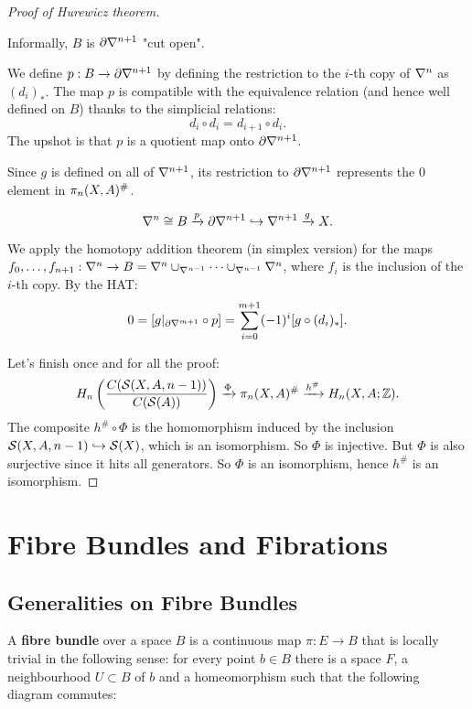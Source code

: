 \begin{proof}[Proof of Hurewicz theorem]
\begin{claimproof}
Informally, $B$ is $\partial\nabla^{n+1}$ "cut open".


We define $p:B\to\partial\nabla^{n+1}$ by defining the restriction to the $i$-th copy of $\nabla^n$ as $(d_i)_*$. The map $p$ is compatible with the equivalence relation (and hence well defined on $B$) thanks to the simplicial relations:
\[d_i\circ d_i=d_{i+1}\circ d_i.\]
The upshot is that $p$ is a quotient map onto $\partial\nabla^{n+1}$.

Since $g$ is defined on all of $\nabla^{n+1}$, its restriction to $\partial\nabla^{n+1}$ represents the $0$ element in $\pi_n(X,A)^\#$.

\[\nabla^n\cong B\xrightarrow{p}\partial\nabla^{n+1}\hookrightarrow\nabla^{n+1}\xrightarrow{g}X.\]

We apply the homotopy addition theorem (in simplex version) for the maps ${{f}_0,\dots,{f}_{n+1}}:\nabla^{n}\to B=\nabla^{n}\cup_{\nabla^{n-1}}\dots\cup_{\nabla^{n-1}}\nabla^{n}$, where $f_i$ is the inclusion of the $i$-th copy.
By the HAT:
\[0=[g|_{\partial \nabla^{m+1}}\circ p]=\sum_{i=0}^{m+1}(-1)^i[g\circ (d_i)_*].\]

\end{claimproof}

Let's finish once and for all the proof:
\[H_n\left(\frac{C(\mathcal{S}(X,A,n-1))}{C(\mathcal{S}(A))}\right)\xrightarrow{\Phi}\pi_n(X,A)^\#\xrightarrow{h^\#}H_n(X,A;{\mathbb Z}).\]
The composite $h^\#\circ\Phi$ is the homomorphism induced by the inclusion $\mathcal{S}(X,A,n-1)\hookrightarrow \mathcal{S}(X)$, which is an isomorphism. So $\Phi$ is injective. But $\Phi$ is also surjective since it hits all generators. So $\Phi$ is an isomorphism, hence $h^\#$ is an isomorphism.
\end{proof}



\chapter{Fibre Bundles and Fibrations}

\section{Generalities on Fibre Bundles}

A \textbf{fibre bundle} over a space $B$ is a continuous map $\pi:E\to B$ that is locally trivial in the following sense: for every point $b\in B$ there is a space $F$, a neighbourhood $U\subset B$ of $b$ and a homeomorphism such that the following diagram commutes:
\begin{center}
\end{center}

